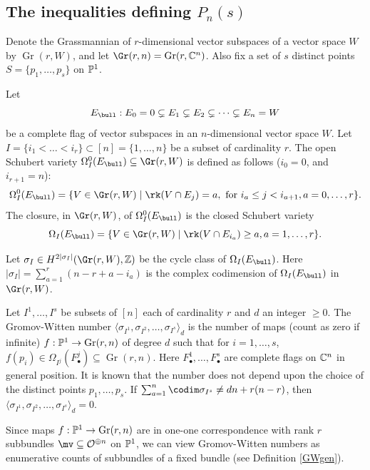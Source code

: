 \subsection{The inequalities defining $P_n(s)$}\label{ABWin}
Denote the Grassmannian of $r$-dimensional vector subspaces of a vector space $W$ by $\operatorname{Gr}(r,W)$, and  let
$\Gr(r,n)=\operatorname{Gr}(r,\Bbb{C}^n)$. Also fix a set of  $s$ distinct points $S=\{p_1,\dots,p_s\}$ on $\Bbb{P}^1$.
\begin{defi}
\notready\label{ineffable}
Let $$E_{\bull}:E_0=0\subsetneq E_1\subsetneq E_2\subsetneq\dots\subsetneq E_n=W$$  be a complete flag of vector subspaces in an $n$-dimensional vector space $W$. Let $I=\{i_1<\dots< i_r\}\subset [n]=\{1,\dots,n\}$ be a subset of cardinality $r$. The open Schubert variety $\Omega^0_I(E_{\bull})\subseteq \Gr(r,W)$ is defined as follows ($i_0=0$, and $i_{r+1}=n$):
$$\Omega^0_I(E_{\bull})=\{V\in \Gr(r,W)\mid \rk (V\cap E_j)=a,\text { for } i_a\leq j<i_{a+1}, a=0,\dots,r\}.$$
The closure, in $\Gr(r,W)$, of $\Omega^0_I(E_{\bull})$ is the closed Schubert variety
$$\Omega_I(E_{\bull})=\{V\in \Gr(r,W)\mid \rk (V\cap E_{i_a})\geq a, a=1,\dots,r\}.$$
\end{defi}
Let $\sigma_I\in H^{2|\sigma_I|}(\Gr(r,W),\Bbb{Z})$ be the cycle class of $\Omega_I(E_{\bull})$. Here
$|\sigma_I|=\sum_{a=1}^r(n-r+a-i_a)$
is the complex codimension of $\Omega_I(E_{\bull})$ in $\Gr(r,W)$.

\begin{defi}
\notready\label{GW}
Let $I^1,\dots ,I^s$ be subsets of $[n]$ each of cardinality $r$ and $d$ an integer $\geq 0$.
The Gromov-Witten number $\langle\sigma_{I^1}, \sigma_{I^2},\dots,\sigma_{I^s}\rangle_d$
is the number of maps (count as zero if infinite) $f:\Bbb{P}^1\to \operatorname{Gr}(r,n)$ of degree $d$ such that for $i=1,\dots,s$,
$f(p_i)\in\Omega_{I^j}(F^j_{\bullet})\subseteq \operatorname{Gr}(r,n)$. Here $F^1_{\bullet},\dots,F^s_{\bullet}$ are complete flags on $\Bbb{C}^n$ in general position. It is known that the number does not depend upon the choice of the distinct points $p_1,\dots,p_s$. If $\sum_{a=1}^n\codim \sigma_{I^s}\neq dn +r(n-r)$, then $\langle\sigma_{I^1}, \sigma_{I^2},\dots,\sigma_{I^s}\rangle_d=0$.

Since maps $f:\Bbb{P}^1\to \operatorname{Gr}(r,n)$ are in one-one correspondence with rank $r$ subbundles $\mv\subseteq \mathcal{O}^{\oplus n}$ on $\Bbb{P}^1$, we can view Gromov-Witten numbers as  enumerative counts of subbundles of a fixed bundle (see Definition \ref{GWgen}).
\end{defi}

